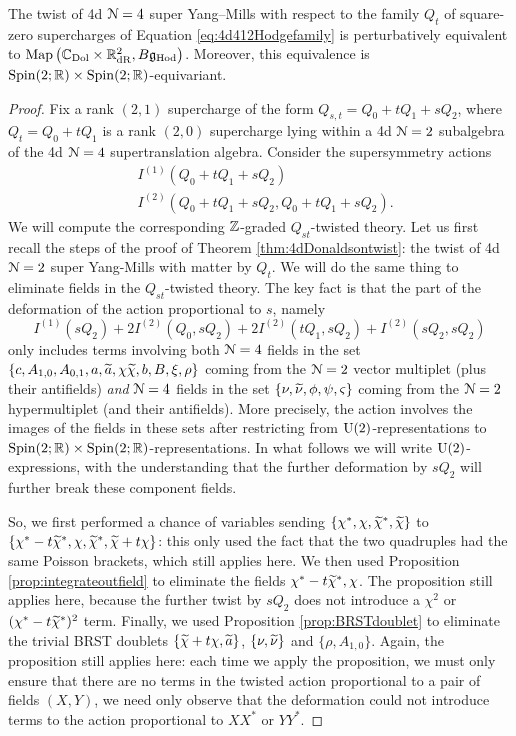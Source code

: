 \documentclass[10pt, oneside]{article}
\newcommand{\Hod}{\mathrm{Hod}}
\begin{document}
\begin{theorem}
The twist of 4d $\mathcal N=4$ super Yang--Mills with respect to the family $Q_t$ of square-zero supercharges of Equation \ref{eq:4d412Hodgefamily} is perturbatively equivalent to $\map\left(\CC_{\rm Dol} \times \RR^2_{\mr{dR}}, B\fg_{\Hod}\right)$. Moreover, this equivalence is $\mathrm{Spin}(2;\mathbb R) \times \mathrm{Spin}(2;\mathbb R)$-equivariant.
\end{theorem}

\begin{proof}
Fix a rank $(2,1)$ supercharge of the form $Q_{s,t} = Q_0 + tQ_1 + sQ_2$, where $Q_t = Q_0 + tQ_1$ is a rank $(2,0)$ supercharge lying within a 4d $\mathcal{N}=2$ subalgebra of the 4d $\mathcal{N}=4$ supertranslation algebra.  Consider the supersymmetry actions 
\begin{align*}
&I^{(1)}(Q_0 + tQ_1 + sQ_2) \\
&I^{(2)}(Q_0 + tQ_1 + sQ_2, Q_0 + tQ_1 + sQ_2).
\end{align*}
We will compute the corresponding $\mathbb Z$-graded $Q_{st}$-twisted theory.  Let us first recall the steps of the proof of Theorem \ref{thm:4dDonaldsontwist}: the twist of 4d $\mathcal{N}=2$ super Yang-Mills with matter by $Q_t$.  We will do the same thing to eliminate fields in the $Q_{st}$-twisted theory.  The key fact is that the part of the deformation of the action proportional to $s$, namely
\[I^{(1)}(sQ_2) + 2 I^{(2)}(Q_0, sQ_2) + 2 I^{(2)}(tQ_1, sQ_2) + I^{(2)}(sQ_2, sQ_2)\]
only includes terms involving both $\mathcal{N}=4$ fields in the set $\{c, A_{1,0}, A_{0,1}, a, \widetilde{a}, \chi \widetilde{\chi}, b, B, \xi, \rho\}$ coming from the $\mathcal{N}=2$ vector multiplet (plus their antifields) \emph{and} $\mathcal{N}=4$ fields in the set $\{\nu, \widetilde{\nu}, \phi, \psi, \varsigma\}$ coming from the $\mathcal{N}=2$ hypermultiplet (and their antifields).  More precisely, the action involves the images of the fields in these sets after restricting from $\mathrm{U}(2)$-representations to $\mathrm{Spin}(2;\mathbb R) \times \mathrm{Spin}(2;\mathbb R)$-representations.  In what follows we will write $\mathrm{U}(2)$-expressions, with the understanding that the further deformation by $sQ_2$ will further break these component fields.

So, we first performed a chance of variables sending $\{\chi^*, \chi, \widetilde{\chi}^*, \widetilde{\chi}\}$ to $\{\chi^*-t\widetilde{\chi}^*, \chi, \widetilde{\chi}^*, \widetilde{\chi} + t\chi\}$: this only used the fact that the two quadruples had the same Poisson brackets, which still applies here.  We then used Proposition \ref{prop:integrateoutfield} to eliminate the fields $\chi^*-t\widetilde{\chi}^*, \chi$.  The proposition still applies here, because the further twist by $sQ_2$ does not introduce a $\chi^2$ or $(\chi^*-t\widetilde{\chi}^*)^2$ term.  Finally, we used Proposition \ref{prop:BRSTdoublet} to eliminate the trivial BRST doublets $\{\widetilde{\chi} + t\chi, \widetilde{a}\}$, $\{\nu, \widetilde{\nu}\}$ and $\{\rho, A_{1, 0}\}$.  Again, the proposition still applies here: each time we apply the proposition, we must only ensure that there are no terms in the twisted action proportional to a pair of fields $(X, Y)$, we need only observe that the deformation could not introduce terms to the action proportional to $XX^*$ or $YY^*$.


\end{proof}
\end{document}
